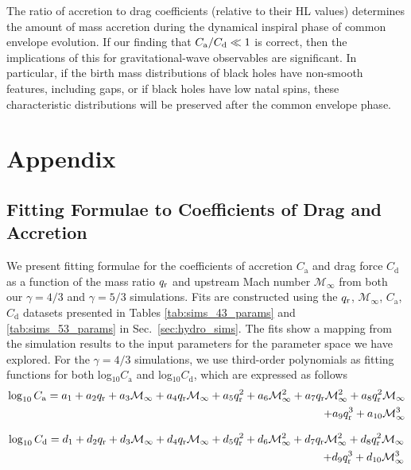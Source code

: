 The ratio of accretion to drag coefficients (relative to their HL values) determines the amount of mass accretion during the dynamical inspiral phase of common envelope evolution. If our finding that $C_{\rm a}/C_{\rm d} \ll 1$ is correct, then the implications of this for gravitational-wave observables are significant. In particular, if the birth mass distributions of black holes have non-smooth features, including gaps, or if black holes have low natal spins, these characteristic distributions will be preserved after the common envelope phase.


\clearpage
\section{Appendix}
\subsection{Fitting Formulae to Coefficients of Drag and Accretion}\label{subsec:fits}
We present fitting formulae for the coefficients of accretion $C_{\mathrm a}$ and drag force $C_{\mathrm d}$ as a function of the mass ratio $q_{\rm r}$ and upstream Mach number $\mathcal{M}_\infty$ from both our $\gamma = 4/3$ and $\gamma = 5/3$ simulations. Fits are constructed using the $q_{\rm r}$, $\mathcal{M}_\infty$, $C_{\mathrm a}$, $C_{\mathrm d}$ datasets presented in Tables \ref{tab:sims_43_params} and \ref{tab:sims_53_params} in Sec.~\ref{sec:hydro_sims}. The fits show a mapping from the simulation results to the input parameters for the parameter space we have explored. For the $\gamma = 4/3$ simulations, we use third-order polynomials as fitting functions for both log$_{10}C_{\mathrm a}$ and log$_{10}C_{\mathrm d}$, which are  expressed as follows
\begin{equation}
\label{eq:logmdot_g43}
\begin{split}
\log_{10} C_{\mathrm a} = a_1 + a_2 q_{\rm r} + a_3\mathcal{M}_\infty + a_4 q_{\rm r}\mathcal{M}_\infty
+ a_5 q_{\rm r}^2 + a_6 \mathcal{M}_\infty^2 
+ a_7 q_{\rm r} \mathcal{M}_\infty^2 + a_8 q_{\rm r}^2\mathcal{M}_\infty \\ + a_9 q_{\rm r}^3 + a_{10} \mathcal{M}_\infty^3
\end{split}
\end{equation}

\begin{equation}
\label{eq:logdrag_g43}
\begin{split}
\log_{10} C_{\mathrm d} = d_1 + d_2 q_{\rm r} + d_3 \mathcal{M}_\infty + d_4 q_{\rm r}\mathcal{M}_\infty + d_5 q_{\rm r}^2 + d_6 \mathcal{M}_\infty^2
+ d_7 q_{\rm r}\mathcal{M}_\infty^2 + d_8 q_{\rm r}^2\mathcal{M}_\infty \\ + d_9 q_{\rm r}^3 + d_{10} \mathcal{M}_\infty^3
\end{split}
\end{equation}
                
